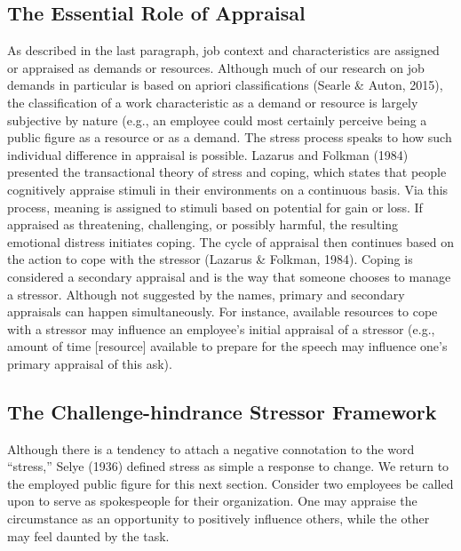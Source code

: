 \documentclass[
  english,
  man]{apa6}
\begin{document}
\hypertarget{the-essential-role-of-appraisal}{%
\subsection{The Essential Role of Appraisal}\label{the-essential-role-of-appraisal}}

As described in the last paragraph, job context and characteristics are assigned or appraised as demands or resources. Although much of our research on job demands in particular is based on apriori classifications (Searle \& Auton, 2015), the classification of a work characteristic as a demand or resource is largely subjective by nature (e.g., an employee could most certainly perceive being a public figure as a resource or as a demand. The stress process speaks to how such individual difference in appraisal is possible. Lazarus and Folkman (1984) presented the transactional theory of stress and coping, which states that people cognitively appraise stimuli in their environments on a continuous basis. Via this process, meaning is assigned to stimuli based on potential for gain or loss. If appraised as threatening, challenging, or possibly harmful, the resulting emotional distress initiates coping. The cycle of appraisal then continues based on the action to cope with the stressor (Lazarus \& Folkman, 1984). Coping is considered a secondary appraisal and is the way that someone chooses to manage a stressor. Although not suggested by the names, primary and secondary appraisals can happen simultaneously. For instance, available resources to cope with a stressor may influence an employee's initial appraisal of a stressor (e.g., amount of time {[}resource{]} available to prepare for the speech may influence one's primary appraisal of this ask).

\hypertarget{the-challenge-hindrance-stressor-framework}{%
\subsection{The Challenge-hindrance Stressor Framework}\label{the-challenge-hindrance-stressor-framework}}

Although there is a tendency to attach a negative connotation to the word ``stress,'' Selye (1936) defined stress as simple a response to change. We return to the employed public figure for this next section. Consider two employees be called upon to serve as spokespeople for their organization. One may appraise the circumstance as an opportunity to positively influence others, while the other may feel daunted by the task.
\end{document}

